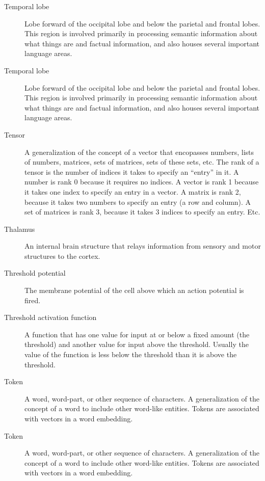 \begin{description}
\item[Temporal lobe] Lobe forward of the occipital lobe and below the parietal and frontal lobes. This region is involved primarily in processing semantic information about what things are and factual information, and also houses several important language areas.

\item[Temporal lobe] Lobe forward of the occipital lobe and below the parietal and frontal lobes. This region is involved primarily in processing semantic information about what things are and factual information, and also houses several important language areas.

\item[Tensor] A generalization of the concept of a vector that encopasses numbers, lists of numbers, matrices, sets of matrices, sets of these sets, etc. The rank of a  tensor is the number of indices it takes to specify an ``entry'' in it.  A number is rank 0 because it requires no indices. A vector is rank 1 because it takes one index to specify an entry in a vector. A matrix is rank 2, because it takes two numbers to specify an entry (a row and column). A set of matrices is rank 3, because it takes 3 indices to specify an entry. Etc.

\item[Thalamus] An internal brain structure that relays information from sensory and motor structures to the cortex.

\item[Threshold potential] The membrane potential of the cell above which an action potential is fired. 

\item[Threshold activation function] A function that has one value for  input at or below a fixed amount (the threshold) and another value for input above the threshold. Usually the value of the function is less below the  threshold than it is above the threshold.

\item[Token] A word, word-part, or other sequence of characters. A generalization of the concept of a word to include other word-like entities. Tokens are associated with vectors in a word embedding.

\item[Token] A word, word-part, or other sequence of characters. A generalization of the concept of a word to include other word-like entities. Tokens are associated with vectors in a word embedding.


\end{description}
